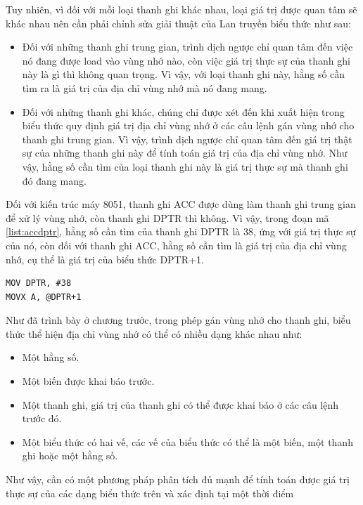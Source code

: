 Tuy nhiên, vì đối với mỗi loại thanh ghi khác nhau, loại giá trị được quan tâm sẽ khác nhau nên cần phải chỉnh sửa giải thuật của Lan truyền biểu thức như sau:
\begin{itemize}
	\item Đối với những thanh ghi trung gian, trình dịch ngược chỉ quan tâm đến việc nó đang được load vào vùng nhớ nào, còn việc giá trị thực sự của thanh ghi này là gì thì không quan trọng. Vì vậy, với loại thanh ghi này, hằng số cần tìm ra là giá trị của địa chỉ vùng nhớ mà nó đang mang.
	\item Đối với những thanh ghi khác, chúng chỉ được xét đến khi xuất hiện trong biểu thức quy định giá trị địa chỉ vùng nhớ ở các câu lệnh gán vùng nhớ cho thanh ghi trung gian. Vì vậy, trình dịch ngược chỉ quan tâm đến giá trị thật sự của những thanh ghi này để tính toán giá trị của địa chỉ vùng nhớ. Như vậy, hằng số cần tìm của loại thanh ghi này là giá trị thực sự mà thanh ghi đó đang mang.
\end{itemize}
Đối với kiến trúc máy 8051, thanh ghi ACC được dùng làm thanh ghi trung gian để xử lý vùng nhớ, còn thanh ghi DPTR thì không. Vì vậy, trong đoạn mã \ref{list:accdptr}, hằng số cần tìm của thanh ghi DPTR là 38, ứng với giá trị thực sự của nó, còn đối với thanh ghi ACC, hằng số cần tìm là giá trị của địa chỉ vùng nhớ, cụ thể là giá trị của biểu thức DPTR+1.
\begin{lstlisting}[caption={Đoạn mã thể hiện hai loại thanh ghi},label={list:accdptr}]
MOV DPTR, #38
MOVX A, @DPTR+1
\end{lstlisting}
Như đã trình bày ở chương trước, trong phép gán vùng nhớ cho thanh ghi, biểu thức thể hiện địa chỉ vùng nhớ có thể có nhiều dạng khác nhau như: 
\begin{itemize}
	\item Một hằng số.
	\item Một biến được khai báo trước.
	\item Một thanh ghi, giá trị của thanh ghi có thể được khai báo ở các câu lệnh trước đó.
	\item Một biểu thức có hai vế, các vế của biểu thức có thể là một biến, một thanh ghi hoặc một hằng số.
\end{itemize}

Như vậy, cần có một phương pháp phân tích đủ mạnh để tính toán được giá trị thực sự của các dạng biểu thức trên và xác định tại một thời điểm

